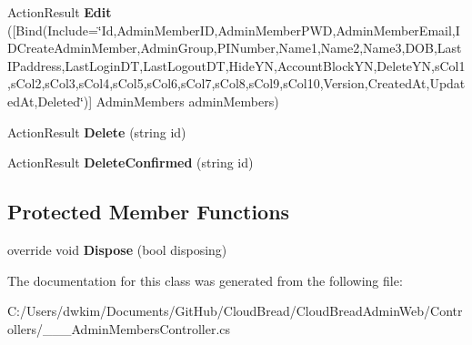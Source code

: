 \begin{DoxyCompactItemize}
\item 
Action\+Result {\bfseries Edit} (\mbox{[}Bind(Include=\char`\"{}Id,Admin\+Member\+ID,Admin\+Member\+P\+WD,Admin\+Member\+Email,I\+D\+Create\+Admin\+Member,Admin\+Group,P\+I\+Number,Name1,Name2,Name3,D\+OB,Last\+I\+Paddress,Last\+Login\+DT,Last\+Logout\+DT,Hide\+YN,Account\+Block\+YN,Delete\+YN,s\+Col1,s\+Col2,s\+Col3,s\+Col4,s\+Col5,s\+Col6,s\+Col7,s\+Col8,s\+Col9,s\+Col10,Version,Created\+At,Updated\+At,Deleted\char`\"{})\mbox{]} Admin\+Members admin\+Members)\hypertarget{class_cloud_bread_admin_web_1_1_controllers_1_1_______admin_members_controller_aba8ccd6915459bfd3533764566e61f0f}{}\label{class_cloud_bread_admin_web_1_1_controllers_1_1_______admin_members_controller_aba8ccd6915459bfd3533764566e61f0f}

\item 
Action\+Result {\bfseries Delete} (string id)\hypertarget{class_cloud_bread_admin_web_1_1_controllers_1_1_______admin_members_controller_a9a376a0f324a7da9293373097d45203c}{}\label{class_cloud_bread_admin_web_1_1_controllers_1_1_______admin_members_controller_a9a376a0f324a7da9293373097d45203c}

\item 
Action\+Result {\bfseries Delete\+Confirmed} (string id)\hypertarget{class_cloud_bread_admin_web_1_1_controllers_1_1_______admin_members_controller_a1396c1936892548cb565f97bf0b159e4}{}\label{class_cloud_bread_admin_web_1_1_controllers_1_1_______admin_members_controller_a1396c1936892548cb565f97bf0b159e4}

\end{DoxyCompactItemize}
\subsection*{Protected Member Functions}
\begin{DoxyCompactItemize}
\item 
override void {\bfseries Dispose} (bool disposing)\hypertarget{class_cloud_bread_admin_web_1_1_controllers_1_1_______admin_members_controller_abd23cd2bacf8036ba8ab0f5b495a2141}{}\label{class_cloud_bread_admin_web_1_1_controllers_1_1_______admin_members_controller_abd23cd2bacf8036ba8ab0f5b495a2141}

\end{DoxyCompactItemize}


The documentation for this class was generated from the following file\+:\begin{DoxyCompactItemize}
\item 
C\+:/\+Users/dwkim/\+Documents/\+Git\+Hub/\+Cloud\+Bread/\+Cloud\+Bread\+Admin\+Web/\+Controllers/\+\_\+\+\_\+\+\_\+\+Admin\+Members\+Controller.\+cs\end{DoxyCompactItemize}
